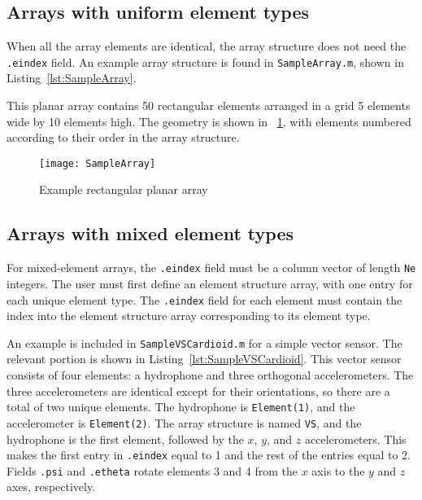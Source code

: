 \subsection{Arrays with uniform element types}

When all the array elements are identical, the array structure does not need the \texttt{.eindex} field. An example array structure is found in \texttt{SampleArray.m}, shown in Listing~\ref{lst:SampleArray}.



This planar array contains 50 rectangular elements arranged in a grid 5 elements wide by 10 elements high. The geometry is shown in \figname~\ref{fig:SampleArray}, with elements numbered according to their order in the array structure.

\begin{figure}[!ht]
\begin{center}
\texttt{[image: SampleArray]}
\caption{\label{fig:SampleArray}Example rectangular planar array}
\end{center}
\end{figure}

\clearpage
\subsection{Arrays with mixed element types}

For mixed-element arrays, the \texttt{.eindex} field must be a column vector of length \texttt{Ne} integers. The user must first define an element structure array, with one entry for each unique element type. The \texttt{.eindex} field for each element must contain the index into the element structure array corresponding to its element type. 

An example is included in \texttt{SampleVSCardioid.m} for a simple vector sensor. The relevant portion is shown in Listing~\ref{lst:SampleVSCardioid}. This vector sensor consists of four elements: a hydrophone and three orthogonal accelerometers. The three accelerometers are identical except for their orientations, so there are a total of two unique elements. The hydrophone is \texttt{Element(1)}, and the accelerometer is \texttt{Element(2)}. The array structure is named \texttt{VS}, and the hydrophone is the first element, followed by the $x$, $y$, and $z$ accelerometers. This makes the first entry in \texttt{.eindex} equal to 1 and the rest of the entries equal to 2. Fields \texttt{.psi} and \texttt{.etheta} rotate elements 3 and 4 from the $x$ axis to the $y$ and $z$ axes, respectively.


